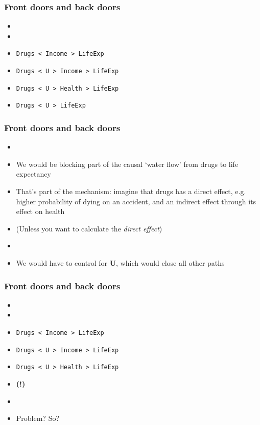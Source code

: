 \documentclass[aspectratio=43]{beamer}
\begin{document}
\begin{frame}
\frametitle{Front doors and back doors}
\centering

\begin{itemize}
  \item {}
  \item {}
  \item \texttt{Drugs < Income > LifeExp}
  \item \texttt{Drugs < U > Income > LifeExp}
  \item \texttt{Drugs < U > Health > LifeExp}
  \item \texttt{Drugs < U > LifeExp}
\end{itemize}

\end{frame}

\begin{frame}
\frametitle{Front doors and back doors}
\centering

\begin{itemize}
  \item {}
  \item We would be blocking part of the causal `water flow' from drugs to life expectancy
  \item That's part of the mechanism: imagine that drugs has a direct effect, e.g. higher probability of dying on an accident, and an indirect effect through its effect on health
  \item (Unless you want to calculate the \textit{direct effect})
  \item[]
  \item<2-> We would have to control for \textbf{U}, which would close all other paths
\end{itemize}

\end{frame}

\begin{frame}
\frametitle{Front doors and back doors}
\centering

\begin{itemize}
  \item {}
  \item {}
  \item \texttt{Drugs < Income > LifeExp}
  \item \texttt{Drugs < U > Income > LifeExp}
  \item \texttt{Drugs < U > Health > LifeExp}
  \item {} \textbf{(!)}
  \item[]
  \item Problem? So?
\end{itemize}

\end{frame}
\end{document}
